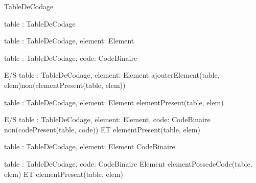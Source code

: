\begin{algorithme}

		{}{TableDeCodage}

		{table : TableDeCodage}{\booleen}

		{table : TableDeCodage, element: Element}{\booleen}

		{table : TableDeCodage, code: CodeBinaire }{\booleen}

		{E/S table : TableDeCodage, element: Element}
		{ajouterElement(table, elem)}{non(elementPresent(table, elem))}

		{table : TableDeCodage, element: Element}{\booleen}
		{elementPresent(table, elem)}

		{E/S table : TableDeCodage, element: Element, code: CodeBinaire}
		{non(codePresent(table, code)) ET elementPresent(table, elem)}

		{table : TableDeCodage, element: Element }{CodeBinaire}

		{table : TableDeCodage, code: CodeBinaire }{Element}
		{elementPossedeCode(table, elem) ET elementPresent(table, elem)}
	
\end{algorithme}

